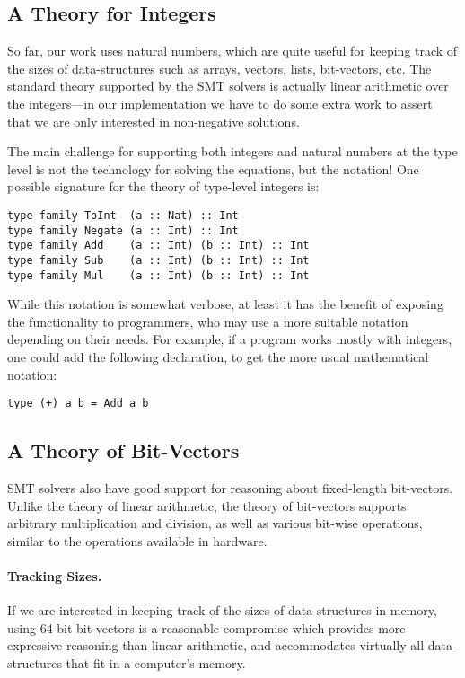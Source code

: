 \documentclass{sigplanconf}
\begin{document}
\subsection{A Theory for Integers}

So far, our work uses natural numbers, which are quite useful for
keeping track of the sizes of data-structures such as arrays, vectors,
lists, bit-vectors, etc.  The standard theory supported by the SMT solvers
is actually linear arithmetic over the integers---in our implementation
we have to do some extra work to assert that we are only interested
in non-negative solutions.

The main challenge for supporting both integers and natural numbers
at the type level is not the technology for solving the equations, but
the notation!  One possible signature for the theory of type-level
integers is:
\begin{Verbatim}
type family ToInt  (a :: Nat) :: Int
type family Negate (a :: Int) :: Int
type family Add    (a :: Int) (b :: Int) :: Int
type family Sub    (a :: Int) (b :: Int) :: Int
type family Mul    (a :: Int) (b :: Int) :: Int
\end{Verbatim}
While this notation is somewhat verbose, at least it has the benefit
of exposing the functionality to programmers, who may use a more suitable
notation depending on their needs.  For example, if a program works
mostly with integers, one could add the following declaration, to get
the more usual mathematical notation:
\begin{Verbatim}
type (+) a b = Add a b
\end{Verbatim}



\subsection{A Theory of Bit-Vectors}
SMT solvers also have good support for reasoning about fixed-length bit-vectors.
Unlike the theory of linear arithmetic, the theory of bit-vectors
supports arbitrary multiplication and division, as well as various bit-wise
operations, similar to the operations available in hardware.

\paragraph{Tracking Sizes.}
If we are interested in keeping track of the sizes of data-structures
in memory, using 64-bit bit-vectors is a reasonable compromise
which provides more expressive reasoning than linear arithmetic,
and accommodates virtually all data-structures that fit in a computer's memory.
\end{document}
